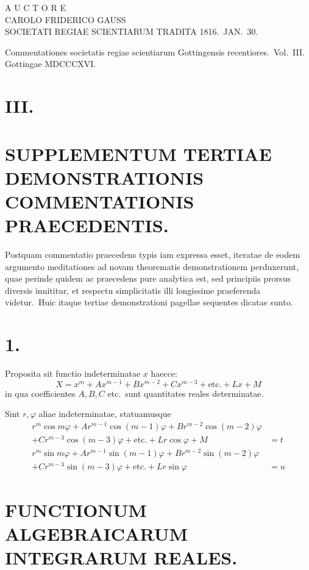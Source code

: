\documentclass[12pt,a4paper]{article}
\theoremstyle{plain}
\begin{document}
A U C T O R E\\
CAROLO FRIDERICO GAUSS\\
SOCIETATI REGIAE SCIENTIARUM TRADITA 1816.\ JAN.\ 30.

\medskip

Commentationes societatis regiae scientiarum Gottingensis recentiores.\ Vol.\ III.\\
Gottingae MDCCCXVI.

\medskip


\section*{III.}

\section*{SUPPLEMENTUM TERTIAE DEMONSTRATIONIS COMMENTATIONIS PRAECEDENTIS.}

Postquam commentatio praecedens typis iam expressa esset, iteratae de eodem argumento meditationes ad novam theorematis demonstrationem perduxerunt,
quae perinde quidem ac praecedens pure analytica est, sed principiis prorsus diversis innititur, et respectu simplicitatis illi longissime praeferenda videtur.\ Huic
itaque tertiae demonstrationi pagellae sequentes dicatae sunto.

\section*{1.}

Proposita sit functio indeterminatae $x$ haecce:
\[
X = x^m + Ax^{m-1} + Bx^{m-2} + Cx^{m-3} + \text{etc.} + Lx + M
\]
in qua coefficientes $A, B, C$ etc.\ sunt quantitates reales determinatae.

Sint $r, \varphi$ aliae indeterminatae, statuamusque
\begin{align*}
r^m \cos m\varphi + Ar^{m-1} \cos(m-1)\varphi + Br^{m-2} \cos(m-2)\varphi &\\
+ Cr^{m-3} \cos(m-3)\varphi + \text{etc.} + Lr \cos\varphi + M &= t \\
r^m \sin m\varphi + Ar^{m-1} \sin(m-1)\varphi + Br^{m-2} \sin(m-2)\varphi &\\
+ Cr^{m-3} \sin(m-3)\varphi + \text{etc.} + Lr \sin\varphi &= u
\end{align*}

\section*{FUNCTIONUM ALGEBRAICARUM INTEGRARUM REALES.}
\end{document}
